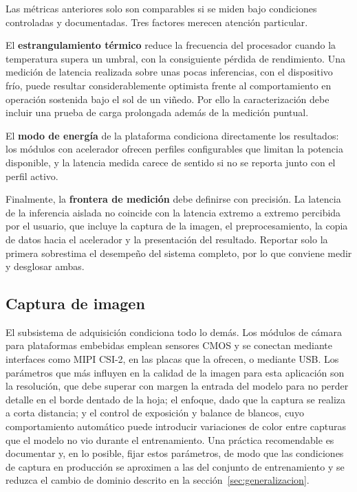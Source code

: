 Las métricas anteriores solo son comparables si se miden bajo condiciones
controladas y documentadas. Tres factores merecen atención particular.

El \textbf{estrangulamiento térmico} reduce la frecuencia del procesador
cuando la temperatura supera un umbral, con la consiguiente pérdida de
rendimiento. Una medición de latencia realizada sobre unas pocas
inferencias, con el dispositivo frío, puede resultar considerablemente
optimista frente al comportamiento en operación sostenida bajo el sol de un
viñedo. Por ello la caracterización debe incluir una prueba de carga
prolongada además de la medición puntual.

El \textbf{modo de energía} de la plataforma condiciona directamente los
resultados: los módulos con acelerador ofrecen perfiles configurables que
limitan la potencia disponible, y la latencia medida carece de sentido si no
se reporta junto con el perfil activo.

Finalmente, la \textbf{frontera de medición} debe definirse con precisión.
La latencia de la inferencia aislada no coincide con la latencia extremo a
extremo percibida por el usuario, que incluye la captura de la imagen, el
preprocesamiento, la copia de datos hacia el acelerador y la presentación
del resultado. Reportar solo la primera sobrestima el desempeño del sistema
completo, por lo que conviene medir y desglosar ambas.

\subsection{Captura de imagen}

El subsistema de adquisición condiciona todo lo demás. Los módulos de cámara
para plataformas embebidas emplean sensores CMOS y se conectan mediante
interfaces como MIPI CSI-2, en las placas que la ofrecen, o mediante USB. Los
parámetros que más influyen en la calidad de la imagen para esta aplicación
son la resolución, que debe superar con margen la entrada del modelo para no
perder detalle en el borde dentado de la hoja; el enfoque, dado que la
captura se realiza a corta distancia; y el control de exposición y balance
de blancos, cuyo comportamiento automático puede introducir variaciones de
color entre capturas que el modelo no vio durante el entrenamiento. Una
práctica recomendable es documentar y, en lo posible, fijar estos parámetros,
de modo que las condiciones de captura en producción se aproximen a las del
conjunto de entrenamiento y se reduzca el cambio de dominio descrito en la
sección~\ref{sec:generalizacion}.

